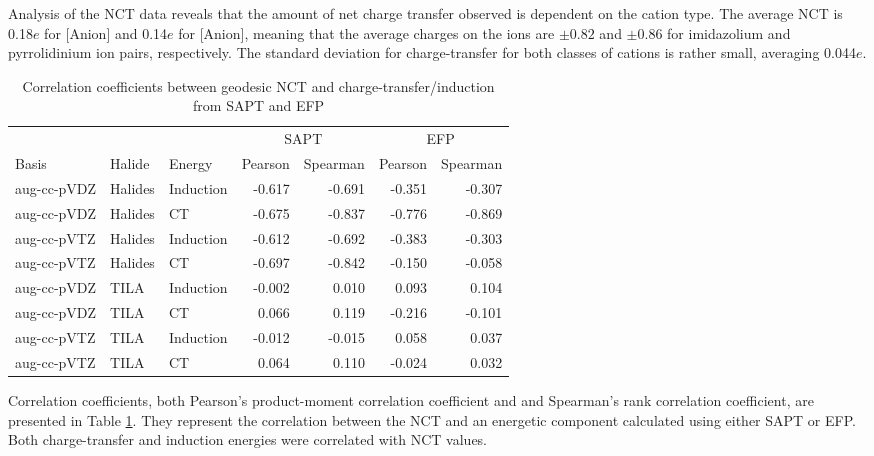 Analysis of the NCT data reveals that the amount of net charge transfer observed is dependent on the cation type.
The average NCT is 0.18$e$ for [Anion] and 0.14$e$ for [Anion], meaning that the average charges on the ions are $\pm 0.82$ and $\pm 0.86$ for imidazolium and pyrrolidinium ion pairs, respectively.
The standard deviation for charge-transfer for both classes of cations is rather small, averaging 0.044$e$.



\begin{table}
    \centering
    \footnotesize
\caption{Correlation coefficients between geodesic NCT and charge-transfer/induction from SAPT and EFP}
\label{tab:geod-corr}
\begin{tabular}{lll|rr|rr}
        \hline
               &            &            & \multicolumn{2}{c}{SAPT} & \multicolumn{2}{c}{EFP} \\
  Basis        & Halide     & Energy     & Pearson    & Spearman    & Pearson    & Spearman   \\ \hline
  aug-cc-pVDZ  & Halides    & Induction  & -0.617     & -0.691      & -0.351     & -0.307     \\
  aug-cc-pVDZ  & Halides    & CT         & -0.675     & -0.837      & -0.776     & -0.869     \\
  aug-cc-pVTZ  & Halides    & Induction  & -0.612     & -0.692      & -0.383     & -0.303     \\
  aug-cc-pVTZ  & Halides    & CT         & -0.697     & -0.842      & -0.150     & -0.058     \\
  aug-cc-pVDZ  & TILA       & Induction  & -0.002     & 0.010       & 0.093      & 0.104      \\
  aug-cc-pVDZ  & TILA       & CT         & 0.066      & 0.119       & -0.216     & -0.101     \\
  aug-cc-pVTZ  & TILA       & Induction  & -0.012     & -0.015      & 0.058      & 0.037      \\
  aug-cc-pVTZ  & TILA       & CT         & 0.064      & 0.110       & -0.024     & 0.032      \\ \hline
\end{tabular}
\end{table}
  

Correlation coefficients, both Pearson's product-moment correlation coefficient and and Spearman's rank correlation coefficient, are presented in Table \ref{tab:geod-corr}.
\cite{Mukaka2012a, Pearson1895a, Edwards1976a}
They represent the correlation between the NCT and an energetic component calculated using either SAPT or EFP. 
Both charge-transfer and induction energies were correlated with NCT values.


